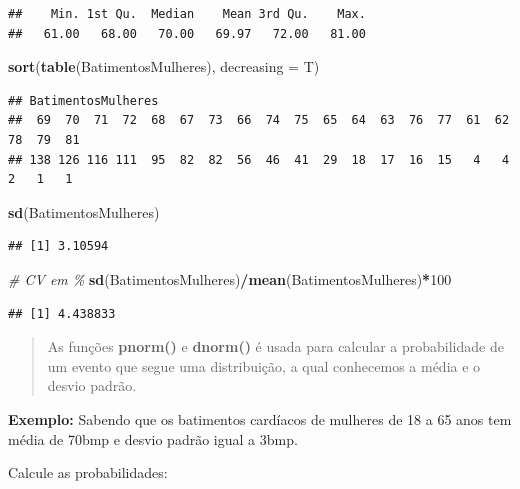 \documentclass[
]{book}
\newenvironment{Shaded}{\begin{snugshade}}{\end{snugshade}}
\newcommand{\AttributeTok}[1]{\textcolor[rgb]{0.13,0.29,0.53}{#1}}
\newcommand{\CommentTok}[1]{\textcolor[rgb]{0.56,0.35,0.01}{\textit{#1}}}
\newcommand{\DecValTok}[1]{\textcolor[rgb]{0.00,0.00,0.81}{#1}}
\newcommand{\FunctionTok}[1]{\textcolor[rgb]{0.13,0.29,0.53}{\textbf{#1}}}
\newcommand{\NormalTok}[1]{#1}
\newcommand{\SpecialCharTok}[1]{\textcolor[rgb]{0.81,0.36,0.00}{\textbf{#1}}}
\begin{document}
\begin{verbatim}
##    Min. 1st Qu.  Median    Mean 3rd Qu.    Max. 
##   61.00   68.00   70.00   69.97   72.00   81.00
\end{verbatim}

\begin{Shaded}
\begin{Highlighting}[]
\FunctionTok{sort}\NormalTok{(}\FunctionTok{table}\NormalTok{(BatimentosMulheres), }\AttributeTok{decreasing =}\NormalTok{ T)}
\end{Highlighting}
\end{Shaded}

\begin{verbatim}
## BatimentosMulheres
##  69  70  71  72  68  67  73  66  74  75  65  64  63  76  77  61  62  78  79  81 
## 138 126 116 111  95  82  82  56  46  41  29  18  17  16  15   4   4   2   1   1
\end{verbatim}

\begin{Shaded}
\begin{Highlighting}[]
\FunctionTok{sd}\NormalTok{(BatimentosMulheres)}
\end{Highlighting}
\end{Shaded}

\begin{verbatim}
## [1] 3.10594
\end{verbatim}

\begin{Shaded}
\begin{Highlighting}[]
\CommentTok{\# CV em \%}
\FunctionTok{sd}\NormalTok{(BatimentosMulheres)}\SpecialCharTok{/}\FunctionTok{mean}\NormalTok{(BatimentosMulheres)}\SpecialCharTok{*}\DecValTok{100}
\end{Highlighting}
\end{Shaded}

\begin{verbatim}
## [1] 4.438833
\end{verbatim}

\begin{quote}
As funções \textbf{pnorm()} e \textbf{dnorm()} é usada para calcular a probabilidade de um evento que segue uma distribuição, a qual conhecemos a média e o desvio padrão.
\end{quote}

\textbf{Exemplo:} Sabendo que os batimentos cardíacos de mulheres de 18 a 65 anos tem média de 70bmp e desvio padrão igual a 3bmp.

Calcule as probabilidades:
\end{document}
